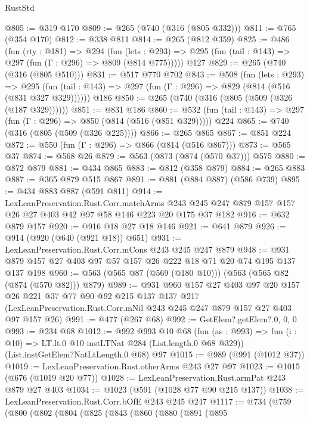 \begin{lexlean}{RustStd}
\begin{coremodule}
{\begin{coremodule}
{{{{{{@805 := @319 @170
@809 := @265 (@740 (@316 (@805 @332)))
@811 := @765 (@354 @170)
@812 := @338 @811
@814 := @265 (@812 @359)
@825 := @486
    (fun (rty : @181) =>
    @294
      (fun (lets : @293) => @295 (fun (tail : @143) => @297 (fun (Γ : @296) => @809 (@814 @775)))))
    @127
@829 := @265 (@740 (@316 (@805 @510)))
@831 := @517 @770 @702
@843 := @508
    (fun (lets : @293) =>
    @295 (fun (tail : @143) => @297 (fun (Γ : @296) => @829 (@814 (@516 (@831 @327 @329))))))
    @186
@850 := @265 (@740 (@316 (@805 (@509 (@326 (@187 @329))))))
@851 := @831 @186
@860 := @532 (fun (tail : @143) => @297 (fun (Γ : @296) => @850 (@814 (@516 (@851 @329))))) @224
@865 := @740 (@316 (@805 (@509 (@326 @225))))
@866 := @265 @865
@867 := @851 @224
@872 := @550 (fun (Γ : @296) => @866 (@814 (@516 @867)))
@873 := @565 @37
@874 := @568 @26
@879 := @563 (@873 (@874 (@570 @37))) @575
@880 := @872 @879
@881 := @434 @865
@883 := @812 (@358 @879)
@884 := @265 @883
@887 := @365 @879 @515 @867
@891 := @881 (@884 @887) (@586 @739)
@895 := @434 @883 @887 (@591 @811)
@914 := LexLeanPreservation.Rust.Corr.matchArms
    @243
    @245
    @247
    @879
    @157
    @157
    @26
    @27
    @403
    @42
    @97
    @58
    @146
    @223
    @20
    @175
    @37
    @182
@916 := @632 @879 @157
@920 := @916 @18 @27 @18 @146
@921 := @641 @879
@926 := @914 (@920 (@640 (@921 @18)) @651)
@931 := LexLeanPreservation.Rust.Corr.mCons @243 @245 @247 @879
@948 := @931 @879 @157 @27 @403 @97 @57 @157 @26 @222 @18 @71 @20 @74 @195 @137 @137 @198
@960 := @563 (@565 @87 (@569 (@180 @10))) (@563 (@565 @82 (@874 (@570 @82))) @879)
@989 := @931
    @960
    @157
    @27
    @403
    @97
    @20
    @157
    @26
    @221
    @37
    @77
    @90
    @92
    @215
    @137
    @137
    @217
    (LexLeanPreservation.Rust.Corr.mNil @243 @245 @247 @879 @157 @27 @403 @97 @157 @26)
@991 := @477 (@267 @68)
@992 := GetElem?.getElem?.{0, 0, 0}
@993 := @234 @68
@1012 := @992
    @993
    @10
    @68
    (fun (as : @993) => fun (i : @10) => LT.lt.{0} @10 instLTNat @284 (List.length.{0} @68 @329))
    (List.instGetElem?NatLtLength.{0} @68)
    @97
@1015 := @989 (@991 (@1012 @37))
@1019 := LexLeanPreservation.Rust.otherArms @243 @27 @97
@1023 := @1015 (@676 (@1019 @20 @77))
@1028 := LexLeanPreservation.Rust.armPat @243 @879 @27 @403
@1034 := @1023 (@591 (@1028 @77 @90 @215 @137))
@1038 := LexLeanPreservation.Rust.Corr.bOfE @243 @245 @247
@1117 := @734
    (@759
      (@800
        (@802
          (@804
            (@825
              (@843
                (@860
                  (@880
                    (@891
                      (@895
}}}}}}
\end{coremodule}}
\end{coremodule}
\end{lexlean}
